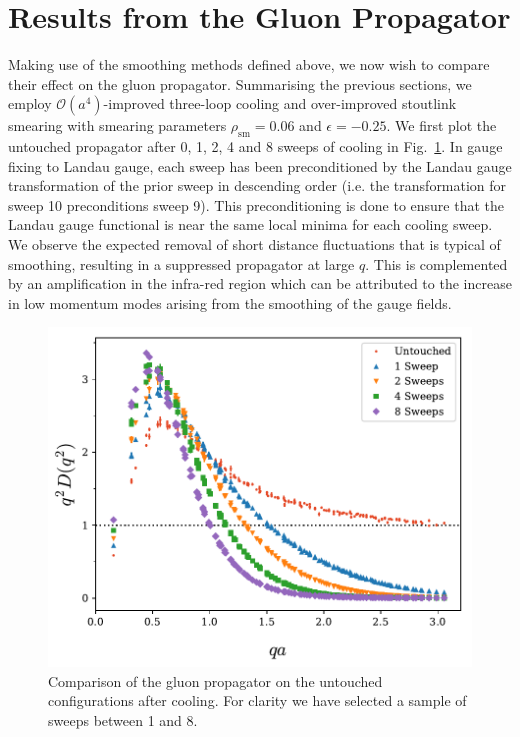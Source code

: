 \section{Results from the Gluon Propagator}\label{sec:CoolingGluProp}

Making use of the smoothing methods defined above, we now wish to compare their effect on the gluon propagator. Summarising the previous sections, we employ $\mathcal{O}(a^4)$-improved three-loop cooling and over-improved stoutlink smearing with smearing parameters $\rho_\text{sm}=0.06$ and $\epsilon=-0.25$. We first plot the untouched propagator after 0, 1, 2, 4 and 8 sweeps of cooling in Fig.~\ref{fig:1to10SweepsCooling}. In gauge fixing to Landau gauge, each sweep has been preconditioned by the Landau gauge transformation of the prior sweep in descending order (i.e. the transformation for sweep 10 preconditions sweep 9). This preconditioning is done to ensure that the Landau gauge functional is near the same local minima for each cooling sweep. We observe the expected removal of short distance fluctuations that is typical of smoothing, resulting in a suppressed propagator at large $q$. This is complemented by an amplification in the infra-red region which can be attributed to the increase in low momentum modes arising from the smoothing of the gauge fields.\\
%
\begin{figure}[tb]
\centering
\includegraphics[width=\linewidth]{./ScalarGluComp_q2_1to10sweeps.pdf}
\caption[Comparison of the gluon propagator on the untouched configurations after cooling.]{\label{fig:1to10SweepsCooling}Comparison of the gluon propagator on the untouched configurations after cooling. For clarity we have selected a sample of sweeps between 1 and 8.}
\end{figure}
%

